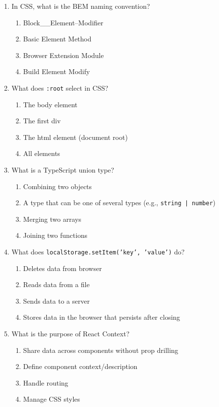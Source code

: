 \documentclass[12pt,a4paper]{article}
\begin{document}
\begin{enumerate}
\item In CSS, what is the BEM naming convention?
\begin{enumerate}[label=\Alph*)]
    \item Block\_\_Element--Modifier
    \item Basic Element Method
    \item Browser Extension Module
    \item Build Element Modify
\end{enumerate}

\item What does \texttt{:root} select in CSS?
\begin{enumerate}[label=\Alph*)]
    \item The body element
    \item The first div
    \item The html element (document root)
    \item All elements
\end{enumerate}

\item What is a TypeScript union type?
\begin{enumerate}[label=\Alph*)]
    \item Combining two objects
    \item A type that can be one of several types (e.g., \texttt{string | number})
    \item Merging two arrays
    \item Joining two functions
\end{enumerate}

\item What does \texttt{localStorage.setItem('key', 'value')} do?
\begin{enumerate}[label=\Alph*)]
    \item Deletes data from browser
    \item Reads data from a file
    \item Sends data to a server
    \item Stores data in the browser that persists after closing
\end{enumerate}

\item What is the purpose of React Context?
\begin{enumerate}[label=\Alph*)]
    \item Share data across components without prop drilling
    \item Define component context/description
    \item Handle routing
    \item Manage CSS styles
\end{enumerate}


\end{enumerate}
\end{document}
